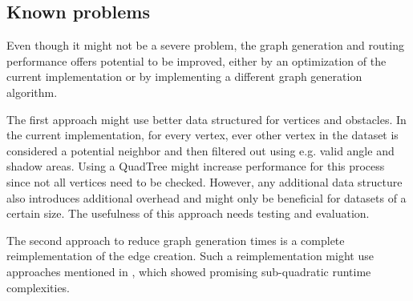 	\subsection{Known problems}
		Even though it might not be a severe problem, the graph generation and routing performance offers potential to be improved, either by an optimization of the current implementation or by implementing a different graph generation algorithm.
		
		The first approach might use better data structured for vertices and obstacles.
		In the current implementation, for every vertex, ever other vertex in the dataset is considered a potential neighbor and then filtered out using e.g. valid angle and shadow areas.
		Using a QuadTree might increase performance for this process since not all vertices need to be checked.
		However, any additional data structure also introduces additional overhead and might only be beneficial for datasets of a certain size.
		The usefulness of this approach needs testing and evaluation.
		
		The second approach to reduce graph generation times is a complete reimplementation of the edge creation.
		Such a reimplementation might use approaches mentioned in , which showed promising sub-quadratic runtime complexities.
		

